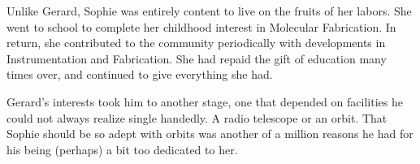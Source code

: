 

Unlike Gerard, Sophie was entirely content to live on the fruits of
her labors.  She went to school to complete her childhood interest in
Molecular Fabrication.  In return, she contributed to the community
periodically with developments in Instrumentation and Fabrication.
She had repaid the gift of education many times over, and continued to
give everything she had.

Gerard's interests took him to another stage, one that depended on
facilities he could not always realize single handedly.  A radio
telescope or an orbit.  That Sophie should be so adept with orbits was
another of a million reasons he had for his being (perhaps) a bit too
dedicated to her.

\bye
